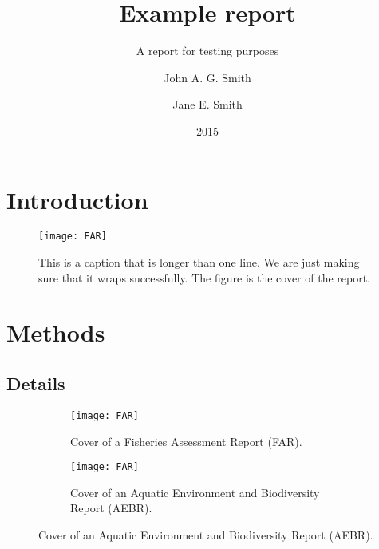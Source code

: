 \documentclass{mpi-far}
\title{Example report}{An example Fisheries Assessment Report (FAR)}
\subtitle{A report for testing purposes}
\date{2015}
\author{John A. G. Smith \and Jane E. Smith}
\begin{document}
\maketitle

\tableofcontents


\summary

\citeself

\lipsum[1]
\clearpage


\section{Introduction}

\lipsum[1]


\begin{figure}[h]
  \begin{center}  
  \texttt{[image: FAR]}
  \end{center}  
  \caption{This is a caption that is longer than one line. We are just
  making sure that it wraps successfully. The figure is the cover of
  the report.}
\end{figure}

\section{Methods}

\subsection{Details}

\lipsum[2]

\begin{figure}[h]
\begin{center}
  \begin{subfigure}{0.45\textwidth}
  \texttt{[image: FAR]}
  \caption{Cover of a Fisheries Assessment Report (FAR).}
\end{subfigure}\qquad
  \begin{subfigure}{0.45\textwidth}
  \texttt{[image: FAR]}
  \caption{Cover of an Aquatic Environment and Biodiversity Report
  (AEBR).}
\end{subfigure}
\end{center}
\end{figure}
\end{document}

